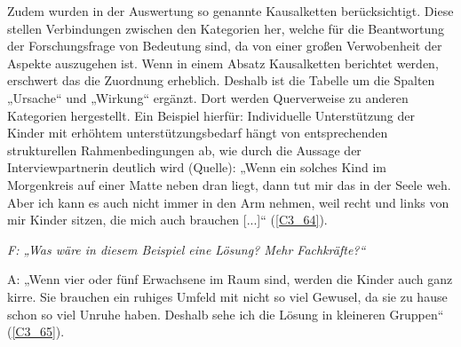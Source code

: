 Zudem wurden in der Auswertung so genannte Kausalketten berücksichtigt. Diese stellen Verbindungen zwischen den Kategorien her, welche für die Beantwortung der Forschungsfrage von Bedeutung sind, da von einer großen Verwobenheit der Aspekte auszugehen ist. Wenn in einem Absatz Kausalketten berichtet werden, erschwert das die Zuordnung erheblich. Deshalb ist die Tabelle um die Spalten „Ursache“ und „Wirkung“ ergänzt. Dort werden Querverweise zu anderen Kategorien hergestellt. Ein Beispiel hierfür: Individuelle Unterstützung der Kinder mit erhöhtem unterstützungsbedarf hängt von entsprechenden strukturellen Rahmenbedingungen ab, wie durch die Aussage der Interviewpartnerin deutlich wird (Quelle): „Wenn ein solches Kind im Morgenkreis auf einer Matte neben dran liegt, dann tut mir das in der Seele weh. Aber ich kann es auch nicht immer in den Arm nehmen, weil recht und links von mir Kinder sitzen, die mich auch brauchen [...]“ (\ref{C3_64}). 

\emph{F: „Was wäre in diesem Beispiel eine Lösung? Mehr Fachkräfte?“}

A: „Wenn vier oder fünf Erwachsene im Raum sind, werden die Kinder auch ganz kirre. Sie brauchen ein ruhiges Umfeld mit nicht so viel Gewusel, da sie zu hause schon so viel Unruhe haben. Deshalb sehe ich die Lösung in kleineren Gruppen“ (\ref{C3_65}).


     
 
